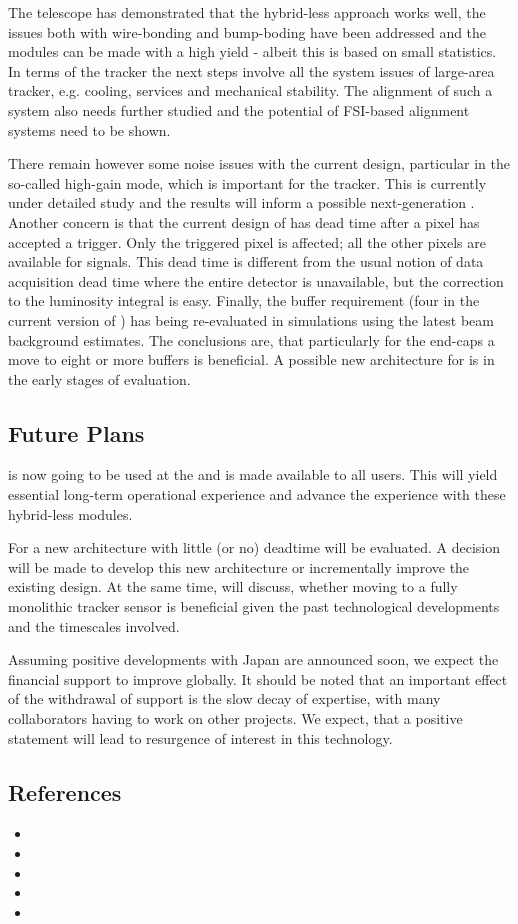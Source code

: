 The \LYCORIS telescope has demonstrated that the hybrid-less approach works well, the issues both with wire-bonding and 
bump-boding have been addressed and the modules can be made with a high yield - albeit this is based on small statistics.
In terms of the \SID tracker the next steps involve all the system issues of large-area tracker, e.g. cooling, services and mechanical stability. 
The alignment of such a system also needs further studied and the potential of FSI-based alignment systems need to be shown. 

There remain however some noise issues with the current \KPIX design, particular in the so-called high-gain mode, 
which is important for the tracker. This is currently under detailed study and the results will inform a possible 
next-generation \KPIX. Another concern is that the current design of \KPIX has dead time after a pixel 
has accepted a trigger. Only the triggered pixel is affected; all the other 
pixels are available for signals. This dead time is different from the usual 
notion of data acquisition dead time where the entire detector is unavailable, 
but the correction to the luminosity integral is easy. Finally, the buffer 
requirement (four in the current version of \KPIX) has being re-evaluated in \SID  
simulations using the latest beam background estimates. The conclusions are, that particularly for 
the end-caps a move to eight or more buffers is beneficial. A possible new architecture for \KPIX is in 
the early stages of evaluation.


\subsection{Future Plans}
\LYCORIS is now going to be used at the \DIITBF and is made available to all users. This will yield essential long-term operational experience and 
advance the experience with these hybrid-less modules.  

For \KPIX a new architecture with little (or no) deadtime will be evaluated. A decision will be made to develop this new architecture or incrementally 
improve the existing design. At the same time, \SID will discuss, whether moving to a fully monolithic tracker sensor is beneficial given the past technological 
developments and the timescales involved.
	
Assuming positive developments with Japan are announced soon, we expect the financial support to improve globally. It should be noted that
an important effect of the withdrawal of support is the slow decay of expertise, with many collaborators having to work on other projects. We expect, that 
a positive statement will lead to resurgence of interest in this technology.

	
\subsection{References}

\begin{itemize}
\item {}
\item {}
\item {}
\item {}
\item {}
\end{itemize}
